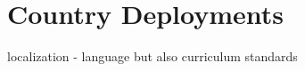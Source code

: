 \section{Country Deployments}
\label{sec:country}



localization - language but also curriculum standards
